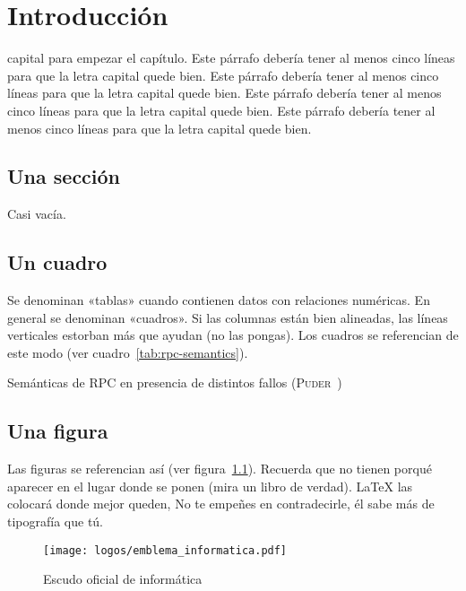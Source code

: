 
\chapter{Introducción}

 capital para empezar el capítulo. Este párrafo debería tener al menos cinco
líneas para que la letra capital quede bien. Este párrafo debería tener al menos cinco
líneas para que la letra capital quede bien. Este párrafo debería tener al menos cinco
líneas para que la letra capital quede bien. Este párrafo debería tener al menos cinco
líneas para que la letra capital quede bien.


\section{Una sección}

Casi vacía.


\section{Un cuadro}
\label{sec:uncuadro}

Se denominan «tablas» cuando contienen datos con relaciones numéricas. En
general se denominan «cuadros». Si las columnas están bien alineadas, las líneas
verticales estorban más que ayudan (no las pongas). Los cuadros se referencian
de este modo (ver cuadro~\ref{tab:rpc-semantics}).

\begin{table}[htbp]
  \centering
  {\small
  
  }
  \caption[Semánticas de \acs{RPC} en presencia de distintos fallos]
  {Semánticas de \acs{RPC} en presencia de distintos fallos
    (\textsc{Puder}~\cite{puder05:_distr_system_archit})}
  \label{tab:rpc-semantics}
\end{table}


\section{Una figura}

Las figuras se referencian así (ver figura~\ref{fig:informatica}). Recuerda que
no tienen porqué aparecer en el lugar donde se ponen (mira un libro de
verdad). \LaTeX{} las colocará donde mejor queden, No te empeñes en
contradecirle, él sabe más de tipografía que tú.

\begin{figure}[!h]
\begin{center}
\texttt{[image: logos/emblema\_informatica.pdf]}
\caption{Escudo oficial de informática}
\label{fig:informatica}
\end{center}
\end{figure}

